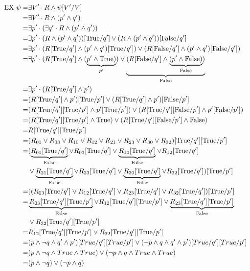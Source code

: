 \begin{align*}
\text{EX } \psi = &\exists V' \cdot R \land \psi[V' / V] \\
= &\exists V' \cdot R \land (p' \land q') \\
= &\exists p'\cdot(\exists q' \cdot R \land (p' \land q')) \\
= &\exists p'\cdot(R \land (p' \land q'))[\text{True}/q'] \lor (R \land (p' \land q'))[\text{False}/q'] \\
= &\exists p'\cdot(R[\text{True}/q'] \land (p' \land q')[\text{True}/q']) \lor (R[\text{False}/q'] \land (p' \land q')[\text{False}/q']) \\
= &\exists p'\cdot(R[\text{True}/q'] \land (\underbrace{p' \land \text{True})}_{p'}) \lor \underbrace{(R[\text{False}/q'] \land \underbrace{(p' \land \text{False})}_{\text{False}})}_{\text{False}} \\ 
= &\exists p'\cdot(R[\text{True}/q'] \land p') \\
= &(R[\text{True}/q'] \land p')[\text{True}/p'] \lor (R[\text{True}/q'] \land p')[\text{False}/p']\\
= &(R[\text{True}/q'][\text{True}/p']  \land p'[\text{True}/p'] )\lor (R[\text{True}/q'][\text{False}/p'] \land p'[\text{False}/p'])\\
= &(R[\text{True}/q'][\text{True}/p']  \land \text{True}) \lor (R[\text{True}/q'][\text{False}/p'] \land \text{False})\\
= & R[\text{True}/q'][\text{True}/p']\\
= &(R_{01} \lor R_{03} \lor R_{10} \lor R_{12} \lor R_{21} \lor R_{23}\lor R_{30} \lor R_{32})[\text{True}/q'][\text{True}/p'] \\
= &(\underbrace{R_{01}[\text{True}/q'] }_{\text{False}}\lor R_{03}[\text{True}/q'] \lor \underbrace{R_{10}[\text{True}/q']}_{\text{False}} \lor R_{12}[\text{True}/q']\\ & \lor \underbrace{R_{21}[\text{True}/q'] }_{\text{False}}\lor R_{23}[\text{True}/q']\lor \underbrace{R_{30}[\text{True}/q']}_{\text{False}} \lor R_{32}[\text{True}/q'])[\text{True}/p'] \\
= &((R_{03}[\text{True}/q'] \lor R_{12}[\text{True}/q'] \lor R_{23}[\text{True}/q'] \lor R_{32}[\text{True}/q'])[\text{True}/p'] \\
= &\underbrace{R_{03}[\text{True}/q'][\text{True}/p']}_{\text{False}}  \lor R_{12}[\text{True}/q'][\text{True}/p']  \lor \underbrace{R_{23}[\text{True}/q'][\text{True}/p']}_{\text{False}}   \\ &\lor R_{32}[\text{True}/q'][\text{True}/p'] \\
= & R_{12}[\text{True}/q'][\text{True}/p'] \lor R_{32}[\text{True}/q'][\text{True}/p'] \\ 
=& (p \land\lnot q \land q' \land p')[True/q'][True/p'] \lor (\lnot p \land q \land q' \land p')[True/q'][True/p'] \\
=& (p \land\lnot q \land True \land True) \lor (\lnot p \land q \land True \land True)\\
=& (p \land\lnot q) \lor (\lnot p \land q )\\
\end{align*}

